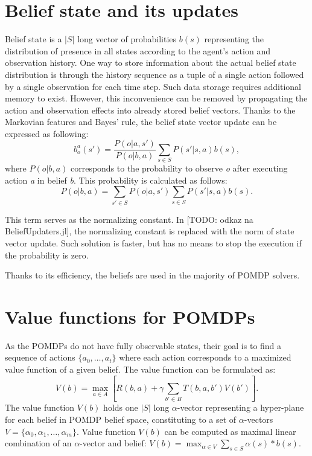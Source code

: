 \section{Belief state and its updates}
Belief state \cite{Walraven19} is a $|S|$ long vector of probabilities $b(s)$ representing the distribution of presence in all states according to the agent's action and observation history.
One way to store information about the actual belief state distribution is through the history sequence as a tuple of a single action followed by a single observation for each time step. Such data storage requires additional memory to exist. However, this inconvenience can be removed by propagating the action and observation effects into already stored belief vectors. Thanks to the Markovian features and Bayes' rule, the belief state vector update can be expressed as following:
$$ b_o^a(s') = \dfrac{P(o|a, s')}{P(o|b, a)} \sum_{s \in S} P(s'|s, a) b(s),$$
where $P(o|b, a)$ corresponds to the probability to observe \textit{o} after executing action \textit{a} in belief \textit{b}. This probability is calculated as follows:
$$ P(o|b, a) = \sum_{s' \in S} P(o|a, s')\sum_{s \in S} P(s'|s, a)b(s).$$

This term serves as the normalizing constant. In [TODO: odkaz na BeliefUpdaters.jl], the normalizing constant is replaced with the norm of state vector update. Such solution is faster, but has no means to stop the execution if the probability is zero.

Thanks to its efficiency, the beliefs are used in the majority of POMDP solvers.

\section{Value functions for POMDPs}
As the POMDPs do not have fully observable states, their goal is to find a sequence of actions $\{a_0, \ldots, a_t\}$ where each action corresponds to a maximized value function of a given belief. The value function can be formulated as:
$$V(b) = \max_{a \in A} [R(b, a) + \gamma \sum_{b' \in B} T(b, a, b') V(b')].$$
The value function $V(b)$ holds one $|S|$ long $\alpha$-vector representing a hyper-plane for each belief in POMDP belief space, constituting to a set of $\alpha$-vectors $V = \{\alpha_0, \alpha_1, \ldots, \alpha_m\}$. Value function $V(b)$ can be computed as maximal linear combination of an $\alpha$-vector and belief: $V(b) = \max_{\alpha \in V} \sum_{s \in S} \alpha (s) * b(s)$.

